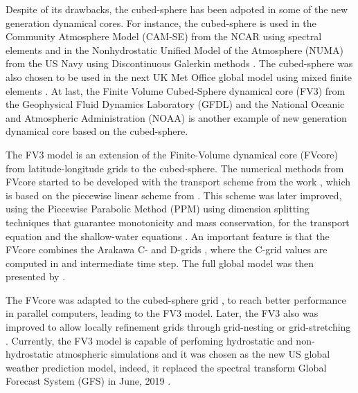 Despite of its drawbacks, the cubed-sphere has been adpoted in some of the new generation
dynamical cores.
For instance, the cubed-sphere is used in the 
Community Atmosphere Model (CAM-SE) from the NCAR using spectral elements \citep{dennis:2012} and in the
Nonhydrostatic Unified Model of the Atmosphere (NUMA) from the US Navy using Discontinuous Galerkin 
methods \citep{giraldo:2013}. The cubed-sphere was also chosen to be used in the next UK Met Office
global model using mixed finite elements \citep{melvin:2022}.
At last, the Finite­ Volume Cubed-Sphere dynamical core (FV3) from the Geophysical Fluid 
Dynamics Laboratory (GFDL) and the National Oceanic and Atmospheric Administration (NOAA)
\citep{putman:2007,harris:2013} is another example
of new generation dynamical core based on the cubed-sphere.

The FV3 model is an extension of the Finite-Volume dynamical core (FVcore)
from latitude-longitude grids to the cubed-sphere.
The numerical methods from FVcore started to be developed with the transport scheme from the work \citet{lin:1994},
which is based on the piecewise linear scheme from \citet{vanleer:1977}. 
This scheme was later improved, using the Piecewise Parabolic Method (PPM) \citep{colella:1984, carpenter:1990}
using dimension splitting techniques that guarantee monotonicity and mass conservation,
for the transport equation \citep{lin:1996} and the shallow-water equations \citep{lin:1997}. 
An important feature is that the FVcore combines the  Arakawa C- and D-grids \citep{arakawa:1997},
where the C-grid values are computed in and intermediate time step. 
The full global model was then presented by \citet{lin:2004}.

The FVcore was adapted to the cubed-sphere grid \citep{putmanthesis:2007, putman:2007}, 
to reach better performance in parallel computers, leading to the FV3 model.
Later, the FV3 also was improved to allow locally refinement grids 
through grid-nesting or grid-stretching \citep{harris:2013}.
Currently, the FV3 model is capable of perfoming hydrostatic and non-hydrostatic atmospheric simulations 
and it was chosen as the new US global weather prediction model, indeed, it replaced the spectral transform
Global Forecast System (GFS) in June, 2019 \citep{samenow:2019}.

